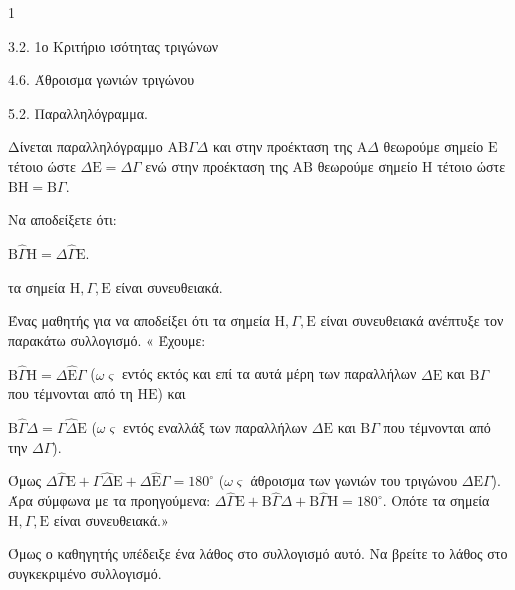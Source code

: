 \begin{ylh}{1}
    \item 3.2. 1ο Κριτήριο ισότητας τριγώνων
    \item 4.6. Άθροισμα γωνιών τριγώνου
    \item 5.2. Παραλληλόγραμμα.
\end{ylh}
Δίνεται παραλληλόγραμμο $\mathrm{A}\mathrm{B}\Gamma\Delta$ και στην προέκταση της $\mathrm{A}\Delta$ θεωρούμε σημείο $\mathrm{E}$ τέτοιο ώστε $\Delta\mathrm{E} = \Delta\Gamma$ ενώ στην προέκταση της $\mathrm{A}\mathrm{B}$ θεωρούμε σημείο $\mathrm{H}$ τέτοιο ώστε $\mathrm{B}\mathrm{H} = \mathrm{B}\Gamma$.
\begin{alist}
    \item Να αποδείξετε ότι:
    \begin{rlist}
        \item $\mathrm{B}\hat{\Gamma}\mathrm{H} = \Delta\hat{\Gamma}\mathrm{E}$. 
        \item τα σημεία $\mathrm{H}, \Gamma, \mathrm{E}$ είναι συνευθειακά. 
    \end{rlist}
    \item Ένας μαθητής για να αποδείξει ότι τα σημεία $\mathrm{H}, \Gamma, \mathrm{E}$ είναι συνευθειακά ανέπτυξε τον παρακάτω συλλογισμό. « Έχουμε:

$\mathrm{B}\hat{\Gamma}\mathrm{H} = \Delta\hat{\mathrm{E}}\Gamma$ ($\omega\varsigma$ εντός εκτός και επί τα αυτά μέρη των παραλλήλων $\Delta\mathrm{E}$ και $\mathrm{B}\Gamma$ που τέμνονται από τη $\mathrm{H}\mathrm{E}$) και

$\mathrm{B}\hat{\Gamma}\Delta = \Gamma\hat{\Delta}\mathrm{E}$ ($\omega\varsigma$ εντός εναλλάξ των παραλλήλων $\Delta\mathrm{E}$ και $\mathrm{B}\Gamma$ που τέμνονται από την $\Delta\Gamma$).

Όμως $\Delta\hat{\Gamma}\mathrm{E} + \Gamma\hat{\Delta}\mathrm{E} + \Delta\hat{\mathrm{E}}\Gamma = 180^\circ$ ($\omega\varsigma$ άθροισμα των γωνιών του τριγώνου $\Delta\mathrm{E}\Gamma$). Άρα σύμφωνα με τα προηγούμενα: $\Delta\hat{\Gamma}\mathrm{E} + \mathrm{B}\hat{\Gamma}\Delta + \mathrm{B}\hat{\Gamma}\mathrm{H} = 180^\circ$. Οπότε τα σημεία $\mathrm{H}, \Gamma, \mathrm{E}$ είναι συνευθειακά.»

Όμως ο καθηγητής υπέδειξε ένα λάθος στο συλλογισμό αυτό. Να βρείτε το λάθος στο συγκεκριμένο συλλογισμό. 
\end{alist}
